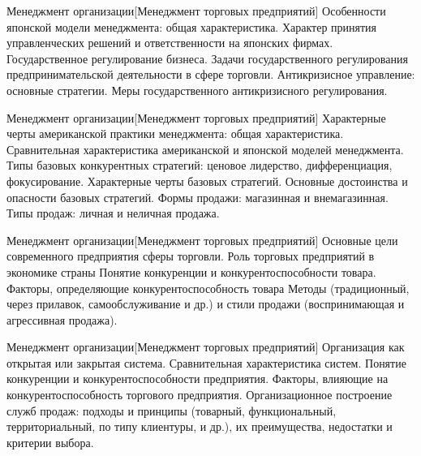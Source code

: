 \documentclass[
	11pt,
	a4paper,
	]
	{article}
\begin{document}
\begin{minipage}[t][\miniH]{\miniL}\centering
	 {Менеджмент организации}[Менеджмент торговых предприятий]
		{
			Особенности японской модели менеджмента: общая характеристика. Характер принятия управленческих решений и ответственности на японских фирмах.
		}{
			Государственное регулирование бизнеса. Задачи государственного регулирования предпринимательской деятельности в сфере торговли.
		}{
			Антикризисное управление: основные стратегии. Меры государственного антикризисного регулирования.
		}
	\lowGE
\end{minipage}

\vfill



\begin{minipage}[t][\miniH]{\miniL}\centering
	 {Менеджмент организации}[Менеджмент торговых предприятий]
		{
			Характерные черты американской практики менеджмента: общая характеристика. Сравнительная характеристика американской и японской моделей менеджмента.
		}{
			Типы базовых конкурентных стратегий: ценовое лидерство, дифференциация, фокусирование. Характерные черты базовых стратегий. Основные достоинства и опасности базовых стратегий.
		}{
			Формы продажи: магазинная и внемагазинная. Типы продаж: личная и неличная продажа.
		}
	\lowGE
\end{minipage}

\vfill



\begin{minipage}[t][\miniH]{\miniL}\centering
	 {Менеджмент организации}[Менеджмент торговых предприятий]
		{
			Основные цели современного предприятия сферы торговли. Роль торговых предприятий в экономике страны
		}{
			Понятие конкуренции и конкурентоспособности товара. Факторы, определяющие конкурентоспособность товара
		}{
			Методы (традиционный, через прилавок, самообслуживание и др.) и стили продажи (воспринимающая и агрессивная продажа).
		}
	\lowGE
\end{minipage}





\begin{minipage}[t][\miniH]{\miniL}\centering
	 {Менеджмент организации}[Менеджмент торговых предприятий]
		{
			Организация как открытая или закрытая система. Сравнительная характеристика систем.
		}{
			Понятие конкуренции и конкурентоспособности предприятия. Факторы, влияющие на конкурентоспособность торгового предприятия.
		}{
			Организационное построение служб продаж: подходы и принципы (товарный, функциональный, территориальный, по типу клиентуры, и др.), их преимущества, недостатки и критерии выбора.
		}
	\lowGE
\end{minipage}
\end{document}

